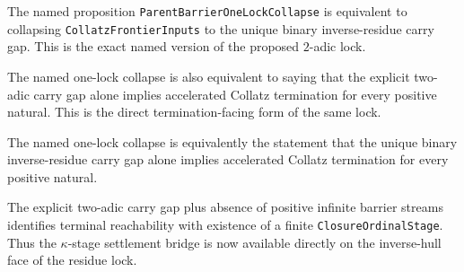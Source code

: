 \begin{theorem}
  \label{thm:collatz-two-adic-unique-named-collapse}
  \leanok
  The named proposition \texttt{ParentBarrierOneLockCollapse} is equivalent to
  collapsing \texttt{CollatzFrontierInputs} to the unique binary inverse-residue
  carry gap. This is the exact named version of the proposed \(2\)-adic lock.
\end{theorem}
\begin{theorem}
  \label{thm:collatz-two-adic-named-collatz-criterion}
  \leanok
  The named one-lock collapse is also equivalent to saying that the explicit
  two-adic carry gap alone implies accelerated Collatz termination for every
  positive natural. This is the direct termination-facing form of the same lock.
\end{theorem}
\begin{theorem}
  \label{thm:collatz-two-adic-unique-named-collatz-criterion}
  \leanok
  The named one-lock collapse is equivalently the statement that the unique
  binary inverse-residue carry gap alone implies accelerated Collatz termination
  for every positive natural.
\end{theorem}
\begin{theorem}
  \label{thm:collatz-two-adic-kappa-stage}
  \leanok
  The explicit two-adic carry gap plus absence of positive infinite barrier streams
  identifies terminal reachability with existence of a finite
  \texttt{ClosureOrdinalStage}. Thus the \(\kappa\)-stage settlement bridge is now
  available directly on the inverse-hull face of the residue lock.
\end{theorem}
